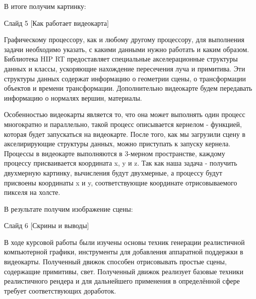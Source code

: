\documentclass[a4paper,14pt]{extarticle}
\begin{document}
В итоге получим картинку:

Слайд 5 [Как работает видеокарта]

Графическому процессору, как и любому другому процессору, для выполнения задачи необходимо указать, с какими данными нужно работать и каким образом.
Библиотека HIP RT предоставляет специальные акселерационные структуры данных и классы, ускоряющие нахождение пересечения луча и примитива. 
Эти структуры данных содержат информацию
о геометрии сцены, о трансформации объектов и времени трансформации. Дополнительно видеокарте будем передавать информацию о нормалях вершин, 
материалы. 

Особенностью видеокарты является то, что она может выполнять один процесс многократно и параллельно, 
такой процесс описывается кернелом - функцией, которая будет запускаться на видеокарте.
После того, как мы загрузили сцену в акселирирующие структуры данных, можно приступать к запуску кернела. 
Процессы в видеокарте выполняются в 3-мерном пространстве, каждому процессу присваивается координата x, y и z. 
Так как наша задача - получить двухмерную картинку, вычисления будут двухмерные, а 
процессу будут присвоены координаты x и y, соответствующие координате отрисовываемого пикселя на холсте.

В результате получим изображение сцены:

Слайд 6 [Скрины и выводы]

В ходе курсовой работы были изучены основы техник генерации реалистичной компьютерной графики, 
инструменты для добавления аппаратной поддержки в видеокарты.
Полученный движок способен отрисовывать простые сцены, содержащие примитивы, свет.
Полученный движок реализует базовые техники реалистичного рендера и для дальнейшего применения
в определённой сфере требует соответствующих доработок. 
\end{document}
